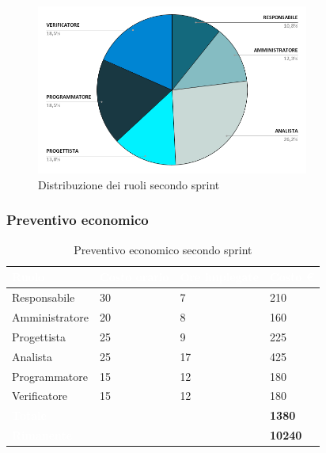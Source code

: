 \begin{figure}[h!]
    \centering
    \includegraphics[width=0.8\textwidth]{prev2ruoli.png}
    \caption{Distribuzione dei ruoli secondo sprint}
    \label{fig:preventivoorariosecondosprint}
\end{figure}


\newpage
\subsubsection{Preventivo economico}

{
\setlength{\tabcolsep}{10pt}
\renewcommand{\arraystretch}{1.5}
\begin{table}[h]
    \centering
    \begin{tabularx}{\textwidth}{| l | l | l | X |}
        \hline
        \rowcolor{headerrow} \textbf{\textcolor{white}{Ruolo}} & \textbf{\textcolor{white}{Costo orario}} & \textbf{\textcolor{white}{Ore impiegate}} & \textbf{\textcolor{white}{Costo €}} \\
        \hline
        Responsabile & 30 & 7 & 210\\
        \hline
        Amministratore & 20 & 8 & 160\\
        \hline
        Progettista& 25 & 9  & 225\\
        \hline
        Analista & 25 & 17  & 425\\
        \hline
        Programmatore & 15 & 12 & 180\\
        \hline
        Verificatore & 15 & 12  & 180\\
        \hline
        \cellcolor{headerrow} \textbf{\textcolor{white}{Totale}} &  &  & \textbf{1380}\\
        \hline
        \cellcolor{headerrow} \textbf{\textcolor{white}{Rimanente}} &  &  & \textbf{10240}\\
        \hline
    \end{tabularx}
    \caption{Preventivo economico secondo sprint}
    \label{tab:preventivocostisecondosprint}
\end{table}
}

